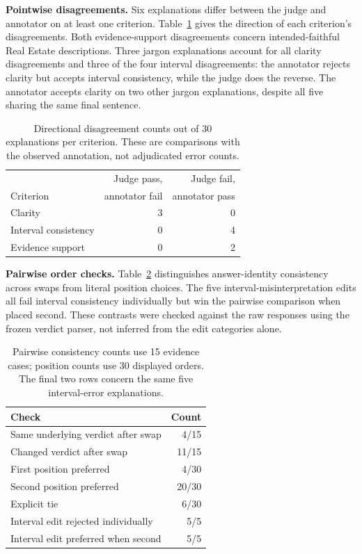 \textbf{Pointwise disagreements.}
Six explanations differ between the judge and annotator on at least one criterion.
Table~\ref{tab:judge-disagreement-counts} gives the direction of each criterion's disagreements.
Both evidence-support disagreements concern intended-faithful Real Estate descriptions.
Three jargon explanations account for all clarity disagreements and three of the four interval disagreements: the annotator rejects clarity but accepts interval consistency, while the judge does the reverse.
The annotator accepts clarity on two other jargon explanations, despite all five sharing the same final sentence.

\begin{table}[t]
\centering
\small
\setlength{\tabcolsep}{4pt}
\begin{tabular}{@{}lrr@{}}
\toprule
& Judge pass, & Judge fail, \\
Criterion & annotator fail & annotator pass \\
\midrule
Clarity & 3 & 0 \\
Interval consistency & 0 & 4 \\
Evidence support & 0 & 2 \\
\bottomrule
\end{tabular}
\caption{Directional disagreement counts out of 30 explanations per criterion.
These are comparisons with the observed annotation, not adjudicated error counts.}
\label{tab:judge-disagreement-counts}
\end{table}

\textbf{Pairwise order checks.}
Table~\ref{tab:judge-order-counts} distinguishes answer-identity consistency across swaps from literal position choices.
The five interval-misinterpretation edits all fail interval consistency individually but win the pairwise comparison when placed second.
These contrasts were checked against the raw responses using the frozen verdict parser, not inferred from the edit categories alone.

\begin{table}[t]
\centering
\small
\setlength{\tabcolsep}{4pt}
\begin{tabular}{@{}lr@{}}
\toprule
Check & Count \\
\midrule
Same underlying verdict after swap & 4/15 \\
Changed verdict after swap & 11/15 \\
First position preferred & 4/30 \\
Second position preferred & 20/30 \\
Explicit tie & 6/30 \\
Interval edit rejected individually & 5/5 \\
Interval edit preferred when second & 5/5 \\
\bottomrule
\end{tabular}
\caption{Pairwise consistency counts use 15 evidence cases; position counts use 30 displayed orders.
The final two rows concern the same five interval-error explanations.}
\label{tab:judge-order-counts}
\end{table}

